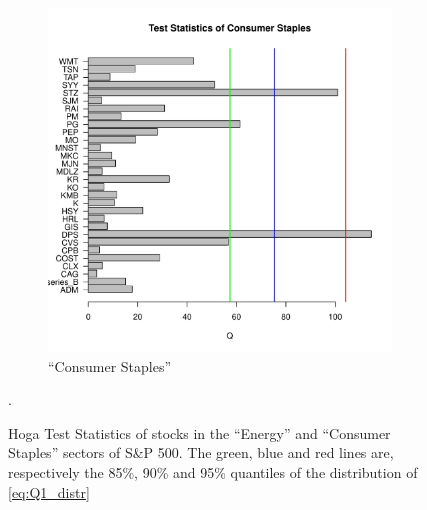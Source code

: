 \documentclass{article}
\begin{document}
\begin{figure}[htb!]
\begin{subfigure}[b]{0.5\linewidth}
    \includegraphics[width=\textwidth]{Hoga_Consumer_Staples_Single.pdf}
    \caption{``Consumer Staples''}
    \label{fig:Hoga_consumer_Staples_Single}
  \end{subfigure}
  \caption{Hoga Test Statistics of stocks in the ``Energy'' and
    ``Consumer Staples'' sectors of
    S\&P 500. The green, blue and red lines are, respectively the
    85\%, 90\% and 95\% quantiles of the distribution of
    \eqref{eq:Q1_distr}}.
\end{figure}
\end{document}
